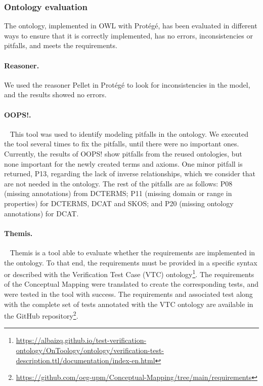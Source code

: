 \subsubsection{Ontology evaluation}
\label{sec:chp4_cm-eval}


The ontology, implemented in OWL with Protégé, has been evaluated in different ways to ensure that it is correctly implemented, has no errors, inconsistencies or pitfalls, and meets the requirements.

\noindent\paragraph{\textbf{Reasoner.}} We used the reasoner Pellet in Protégé to look for inconsistencies in the model, and the results showed no errors.

\noindent\paragraph{\textbf{OOPS!.}}~\parencite{poveda2014oops} This tool was used to identify modeling pitfalls in the ontology. We executed the tool several times to fix the pitfalls, until there were no important ones. Currently, the results of OOPS! show pitfalls from the reused ontologies, but none important for the newly created terms and axioms. One minor pitfall is returned, P13, regarding the lack of inverse relationships, which we consider that are not  needed in the ontology. The rest of the pitfalls are as follows: P08 (missing annotations) from DCTERMS; P11 (missing domain or range in properties) for DCTERMS, DCAT and SKOS; and P20 (missing ontology annotations) for DCAT.

\noindent\paragraph{\textbf{Themis.}}~\parencite{fernandez2021themis} Themis is a tool able to evaluate whether the requirements are implemented in the ontology. To that end, the requirements must be provided in a specific syntax or described with the Verification Test Case (VTC) ontology\footnote{\url{https://albaizq.github.io/test-verification-ontology/OnToology/ontology/verification-test-description.ttl/documentation/index-en.html}}. The requirements of the Conceptual Mapping were translated to create the corresponding tests, and were tested in the tool with success. The requirements and associated test along with the complete set of tests annotated with the VTC ontology are available in the GitHub repository\footnote{\url{https://github.com/oeg-upm/Conceptual-Mapping/tree/main/requirements}}.

